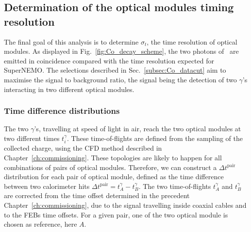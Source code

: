 









\subsection{Determination of the optical modules timing resolution}


The final goal of this analysis is to determine $\sigma_{t}$, the time resolution of optical modules.
As displayed in Fig.~\ref{fig:Co_decay_scheme}, the two photons of \Co\ are emitted in coincidence compared with the time resolution expected for SuperNEMO.
The selections described in Sec.~\ref{subsec:Co_datacut} aim to maximise the signal to background ratio, the signal being the detection of two $\gamma$'s interacting in two different optical modules.


\subsubsection*{Time difference distributions}

The two $\gamma$'s, travelling at speed of light in air, reach the two optical modules at two different times $t^{\gamma}_{i}$.
These time-of-flights are defined from the sampling of the collected charge, using the CFD method described in Chapter~\ref{ch:commissioning}.
These topologies are likely to happen for all combinations of pairs of optical modules.
Therefore, we can construct a $\Delta t^{\text{pair}}$ distribution for each pair of optical module, defined as the time difference between two calorimeter hits $\Delta t^{\text{pair}} = t^{\gamma}_{A} - t^{\gamma}_{B}$.
The two time-of-flights $t^{\gamma}_{A}$ and $t^{\gamma}_{B}$ are corrected from the time offset determined in the precedent Chapter~\ref{ch:commissioning}, due to the signal travelling inside coaxial cables and to the FEBs time offsets.
For a given pair, one of the two optical module is chosen as reference, here $A$.

